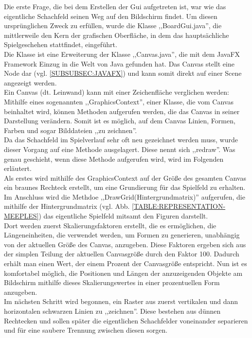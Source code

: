 \documentclass[12pt,a4paper]{article}
\begin{document}
Die erste Frage, die bei dem Erstellen der Gui aufgetreten ist, war wie das eigentliche Schachfeld seinen Weg auf den Bildschirm findet. 
Um diesen ursprünglichen Zweck zu erfüllen, wurde die Klasse ,,BoardGui.java'', die mittlerweile den Kern der grafischen Oberfläche, in dem das hauptsächliche Spielgeschehen stattfindet, eingeführt. \\
Die Klasse ist eine Erweiterung der Klasse ,,Canvas.java'', die mit dem JavaFX Framework Einzug in die Welt von Java gefunden hat. Das Canvas stellt eine Node dar (vgl.  \ref{SUBSUBSEC:JAVAFX}) und kann somit direkt auf einer Scene angezeigt werden.\\
Ein Canvas (dt. Leinwand) kann mit einer Zeichenfläche verglichen werden: Mithilfe eines sogenannten ,,GraphicsContext'', einer Klasse, die vom Canvas beinhaltet wird, können Methoden aufgerufen werden, die das Canvas in seiner Darstellung verändern. Somit ist es möglich, auf dem Canvas Linien, Formen, Farben und sogar Bilddateien ,,zu zeichnen''. \\
Da das Schachfeld im Spielverlauf sehr oft neu gezeichnet werden muss, wurde dieser Vorgang auf eine Methode ausgelagert. Diese nennt sich ,,redraw''. Was genau geschieht, wenn diese Methode aufgerufen wird, wird im Folgenden erläutert. \\[2ex]
Als erstes wird mithilfe des GraphicsContext auf der Größe des gesamten Canvas ein braunes Rechteck erstellt, um eine Grundierung für das Spielfeld zu erhalten. 
Im Anschluss wird die Methdoe ,,DrawGrid(Hintergrundmatrix)'' aufgerufen, die mithilfe der Hintergrundmatrix (vgl. Abb. \ref{TABLE:REPRESENTATION-MEEPLES}) das eigentliche Spielfeld mitsamt den Figuren darstellt.\\ 
Dort werden zuerst Skalierungsfaktoren erstellt, die es ermöglichen, die Längeneinheiten, die verwendet werden, um Formen zu generieren, unabhängig von der aktuellen Größe des Canvas, anzugeben. Diese Faktoren ergeben sich aus der simplen Teilung der aktuellen Canvasgröße durch den Faktor 100. Dadurch erhält man einen Wert, der einem Prozent der Canvasgröße entspricht. Nun ist es komfortabel möglich, die Positionen und Längen der anzuzeigenden Objekte am Bildschirm mithilfe dieses Skalierungswertes in einer prozentuellen Form anzugeben.\\
Im nächsten Schritt wird begonnen, ein Raster aus zuerst vertikalen und dann horizontalen schwarzen Linien zu ,,zeichnen''. Diese bestehen aus dünnen Rechtecken und sollen später die eigentlichen Schachfelder voneinander separieren und für eine saubere Trennung zwischen diesen sorgen.\\
\end{document}
